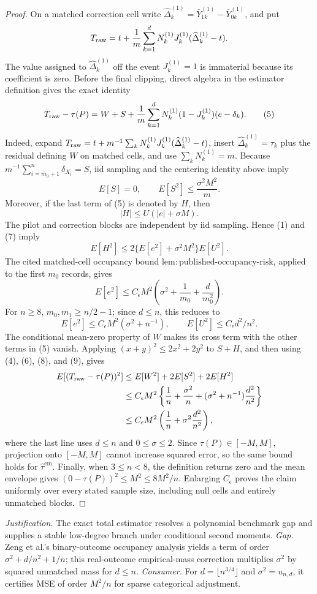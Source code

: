 \documentclass{article}
\begin{document}
\begin{proof}
On a matched correction cell write
\(
 \widehat\Delta_k^{(1)}=\overline Y_{1k}^{(1)}-\overline Y_{0k}^{(1)}
\), and put
\[
 T_{\rm raw}=t+\frac1m\sum_{k=1}^dN_k^{(1)}J_k^{(1)}
 (\widehat\Delta_k^{(1)}-t).
\]
The value assigned to \(\widehat\Delta_k^{(1)}\) off the event \(J_k^{(1)}=1\) is immaterial because its coefficient is zero.  Before the final clipping, direct algebra in the estimator definition gives the exact identity
\[
 T_{\rm raw}-\tau(P)
 =W+S+\frac1m\sum_{k=1}^dN_k^{(1)}(1-J_k^{(1)})(e-\delta_k). \tag{5}
\]
Indeed, expand \(T_{\rm raw}=t+m^{-1}\sum_kN_k^{(1)}J_k^{(1)}(\widehat\Delta_k^{(1)}-t)\), insert \(\widehat\Delta_k^{(1)}=\tau_k\) plus the residual defining \(W\) on matched cells, and use \(\sum_kN_k^{(1)}=m\).  Because \(m^{-1}\sum_{i=m_0+1}^n\delta_{X_i}=S\), iid sampling and the centering identity above imply
\[
 E[S]=0,\qquad E[S^2]\leq\frac{\sigma^2M^2}{m}. \tag{6}
\]
Moreover, if the last term of (5) is denoted by \(H\), then
\[
 |H|\leq U(|e|+\sigma M). \tag{7}
\]
The pilot and correction blocks are independent by iid sampling.  Hence (1) and (7) imply
\[
 E[H^2]
 \leq2\{E[e^2]+\sigma^2M^2\}E[U^2]. \tag{8}
\]
The cited matched-cell occupancy bound \(\mathrm{lem:published\text{-}occupancy\text{-}risk}\), applied to the first \(m_0\) records, gives
\[
 E[e^2]\leq C_{\epsilon}M^2
 \left(\sigma^2+\frac1{m_0}+\frac d{m_0^2}\right).
\]
For \(n\geq8\), \(m_0,m_1\geq n/2-1\); since \(d\leq n\), this reduces to
\[
 E[e^2]\leq C_{\epsilon}M^2(\sigma^2+n^{-1}),
 \qquad
 E[U^2]\leq C_{\epsilon}d^2/n^2. \tag{9}
\]
The conditional mean-zero property of \(W\) makes its cross term with the other terms in (5) vanish.  Applying \((x+y)^2\leq2x^2+2y^2\) to \(S+H\), and then using (4), (6), (8), and (9), gives
\[
 \begin{aligned}
 E[(T_{\rm raw}-\tau(P))^2]
 &\leq E[W^2]+2E[S^2]+2E[H^2]\\
 &\leq C_{\epsilon}M^2\left\{
 \frac1n+\frac{\sigma^2}{n}
 +(\sigma^2+n^{-1})\frac{d^2}{n^2}\right\}\\
 &\leq C_{\epsilon}M^2\left(\frac1n+\sigma^2\frac{d^2}{n^2}\right),
 \end{aligned}
\]
where the last line uses \(d\leq n\) and \(0\leq\sigma\leq2\).  Since \(\tau(P)\in[-M,M]\), projection onto \([-M,M]\) cannot increase squared error, so the same bound holds for \(\widehat\tau^{\mathrm{em}}\).  Finally, when \(3\leq n<8\), the definition returns zero and the mean envelope gives \((0-\tau(P))^2\leq M^2\leq8M^2/n\).  Enlarging \(C_{\epsilon}\) proves the claim uniformly over every stated sample size, including null cells and entirely unmatched blocks.
\end{proof}
\par\smallskip\noindent \textit{Justification.} The exact total estimator resolves a polynomial benchmark gap and supplies a stable low-degree branch under conditional second moments. \textit{Gap.} Zeng et al.'s binary-outcome occupancy analysis yields a term of order \(\sigma^2+d/n^2+1/n\); this real-outcome empirical-mass correction multiplies \(\sigma^2\) by squared unmatched mass for \(d\le n\). \textit{Consumer.} For \(d=\lfloor n^{3/4}\rfloor\) and \(\sigma^2=u_{n,d}\), it certifies MSE of order \(M^2/n\) for sparse categorical adjustment.
\end{document}
